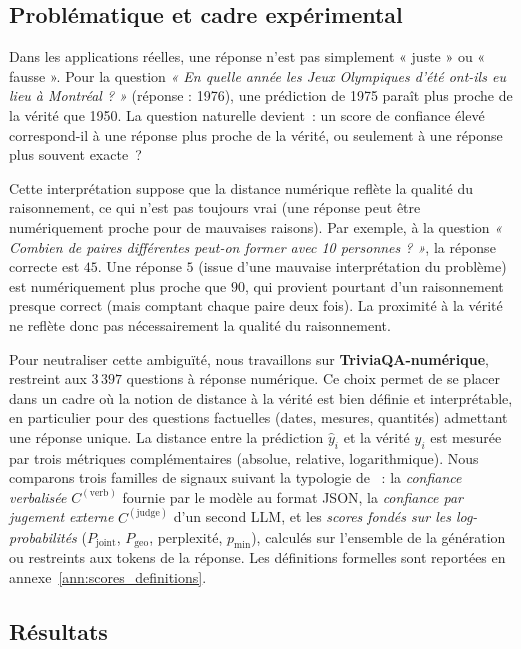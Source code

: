 \documentclass[12pt,a4paper]{article}
\begin{document}
\subsection{Problématique et cadre expérimental}
Dans les applications réelles, une réponse n'est pas simplement « juste » ou « fausse ». Pour la question \textit{« En quelle année les Jeux Olympiques d'été ont-ils eu lieu à Montréal ? »} (réponse : 1976), une prédiction de 1975 paraît plus proche de la vérité que 1950. La question naturelle devient~: un score de confiance élevé correspond-il à une réponse plus proche de la vérité, ou seulement à une réponse plus souvent exacte~?

Cette interprétation suppose que la distance numérique reflète la qualité du raisonnement, ce qui n'est pas toujours vrai (une réponse peut être numériquement proche pour de mauvaises raisons). Par exemple, à la question \textit{« Combien de paires différentes peut-on former avec 10 personnes ? »}, la réponse correcte est $45$. Une réponse $5$ (issue d'une mauvaise interprétation du problème) est numériquement plus proche que $90$, qui provient pourtant d’un raisonnement presque correct (mais comptant chaque paire deux fois). La proximité à la vérité ne reflète donc pas nécessairement la qualité du raisonnement.

Pour neutraliser cette ambiguïté, nous travaillons sur \textbf{TriviaQA-numérique}, restreint aux $3\,397$ questions à réponse numérique. Ce choix permet de se placer dans un cadre où la notion de distance à la vérité est bien définie et interprétable, en particulier pour des questions factuelles (dates, mesures, quantités) admettant une réponse unique. La distance entre la prédiction $\hat{y}_i$ et la vérité $y_i$ est mesurée par trois métriques complémentaires (absolue, relative, logarithmique). Nous comparons trois familles de signaux suivant la typologie de \citet{xiong2024}~: la \emph{confiance verbalisée} $C^{(\text{verb})}$ fournie par le modèle au format JSON, la \emph{confiance par jugement externe} $C^{(\text{judge})}$ d'un second LLM, et les \emph{scores fondés sur les log-probabilités} ($P_{\mathrm{joint}}$, $P_{\mathrm{geo}}$, perplexité, $p_{\min}$), calculés sur l'ensemble de la génération ou restreints aux tokens de la réponse. Les définitions formelles sont reportées en annexe~\ref{ann:scores_definitions}.

\subsection{Résultats}
\end{document}
